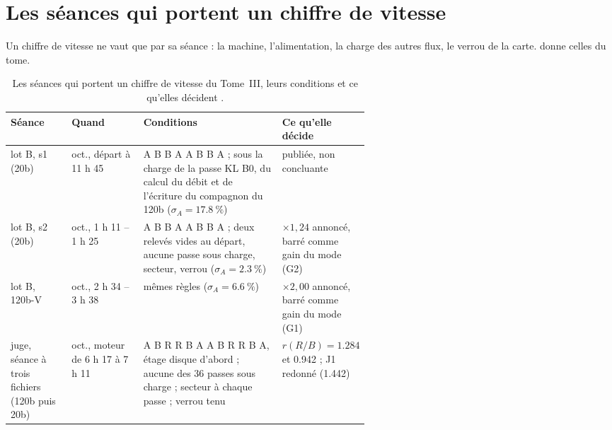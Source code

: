 \section{Les séances qui portent un chiffre de vitesse}\label{t3ann:sec:seances}

Un chiffre de vitesse ne vaut que par sa séance : la machine, l'alimentation, la charge des autres flux, le verrou de la carte.  donne celles du tome.

\begin{table}[ht]
\centering\footnotesize
\caption[Les séances de vitesse du Tome~III]{Les séances qui portent un chiffre de vitesse du Tome~III, leurs conditions et ce qu'elles décident \mes.}
\label{t3ann:tab:seances}
\begin{tabularx}{\linewidth}{@{}>{\raggedright\arraybackslash}p{0.17\linewidth}>{\raggedright\arraybackslash}p{0.20\linewidth}>{\raggedright\arraybackslash}X>{\raggedright\arraybackslash}p{0.22\linewidth}@{}}
\toprule
Séance & Quand & Conditions & Ce qu'elle décide \\
\midrule
lot B, s1 (20b) & 17 oct., départ à 11 h 45 & A B B A A B B A ; sous la charge de la passe KL B0, du calcul du débit et de l'écriture du compagnon du 120b ($\sigma_A = \SI{17.8}{\percent}$) & publiée, non concluante \\
lot B, s2 (20b) & 22 oct., 1 h 11 -- 1 h 25 & A B B A A B B A ; deux relevés vides au départ, aucune passe sous charge, secteur, verrou ($\sigma_A = \SI{2.3}{\percent}$) & $\times 1{,}24$ annoncé, barré comme gain du mode (G2) \\
lot B, 120b-V & 22 oct., 2 h 34 -- 3 h 38 & mêmes règles ($\sigma_A = \SI{6.6}{\percent}$) & $\times 2{,}00$ annoncé, barré comme gain du mode (G1) \\
juge, séance à trois fichiers (120b puis 20b) & 22 oct., moteur de 6 h 17 à 7 h 11 & A B R R B A A B R R B A, étage disque d'abord ; aucune des 36 passes sous charge ; secteur à chaque passe ; verrou tenu & $r(R/B) = \num{1.284}$ et \num{0.942} ; J1 redonné (\num{1.442}) \\
\bottomrule
\end{tabularx}
\end{table}

